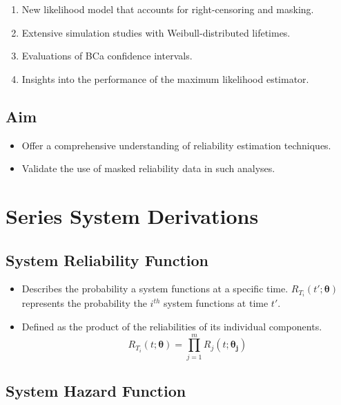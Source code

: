 \documentclass[]{tufte-book}
\providecommand{\tightlist}{%
  \setlength{\itemsep}{0pt}\setlength{\parskip}{0pt}}
\theoremstyle{definition}
\theoremstyle{plain}
\begin{document}
\begin{enumerate}
\def\labelenumi{\arabic{enumi}.}
\tightlist
\item
  New likelihood model that accounts for right-censoring and masking.
\item
  Extensive simulation studies with Weibull-distributed lifetimes.
\item
  Evaluations of BCa confidence intervals.
\item
  Insights into the performance of the maximum likelihood estimator.
\end{enumerate}

\hypertarget{aim}{%
\section{Aim}\label{aim}}

\begin{itemize}
\tightlist
\item
  Offer a comprehensive understanding of reliability estimation techniques.
\item
  Validate the use of masked reliability data in such analyses.
\end{itemize}

\hypertarget{series-system-derivations}{%
\chapter{Series System Derivations}\label{series-system-derivations}}

\hypertarget{system-reliability-function}{%
\section{System Reliability Function}\label{system-reliability-function}}

\begin{itemize}
\tightlist
\item
  Describes the probability a system functions at a specific time.
  \(R_{T_i}(t';\boldsymbol{\theta})\) represents the probability the \(i^{th}\) system functions at time \(t'\).
\item
  Defined as the product of the reliabilities of its individual components.
  \[ R_{T_i}(t;\boldsymbol{\theta}) = \prod_{j=1}^m R_j(t;\boldsymbol{\theta_j}) \]
\end{itemize}

\hypertarget{system-hazard-function}{%
\section{System Hazard Function}\label{system-hazard-function}}
\end{document}
